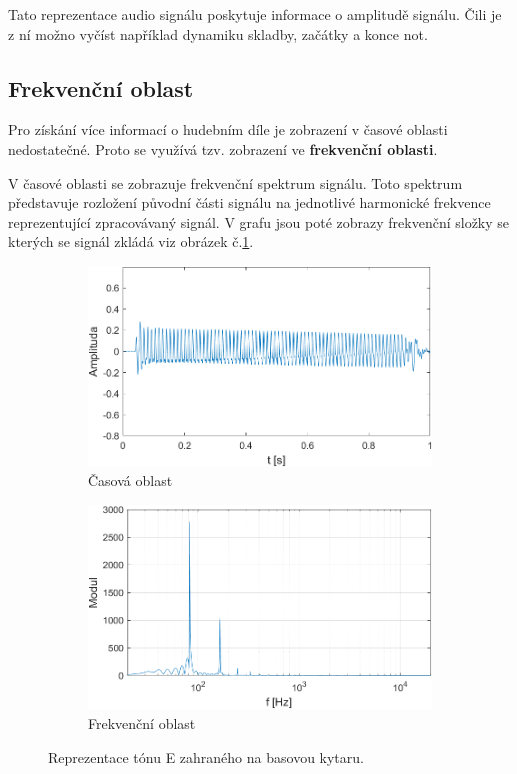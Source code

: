   Tato reprezentace audio signálu poskytuje informace o amplitudě signálu. Čili je z ní možno vyčíst například dynamiku skladby, začátky a konce not.
  
  \subsection{Frekvenční oblast} \label{sec:FFT}
  Pro získání více informací o hudebním díle je zobrazení v časové oblasti nedostatečné.
  Proto se využívá tzv. zobrazení ve \textbf{frekvenční oblasti}.

  V časové oblasti se zobrazuje frekvenční spektrum signálu.
  Toto spektrum představuje rozložení původní části signálu na jednotlivé harmonické frekvence reprezentující zpracovávaný signál.
  V grafu jsou poté zobrazy frekvenční složky se kterých se signál zkládá viz obrázek č.\ref*{fig:Bass_tone}.

  \begin{figure}[H]
    \centering
    \begin{subfigure}[b]{0.8\linewidth}
        \includegraphics[width = \linewidth]{obrazky/Bass_tone_waveform.png}
        \caption{Časová oblast}
    \end{subfigure}
    \begin{subfigure}[b]{0.8\linewidth}
        \includegraphics[width = \linewidth]{obrazky/Bass_tone_spectrum.png}
        \caption{Frekvenční oblast}
    \end{subfigure}
    \caption{Reprezentace tónu E zahraného na basovou kytaru.}
    \label{fig:Bass_tone}
\end{figure}
  
